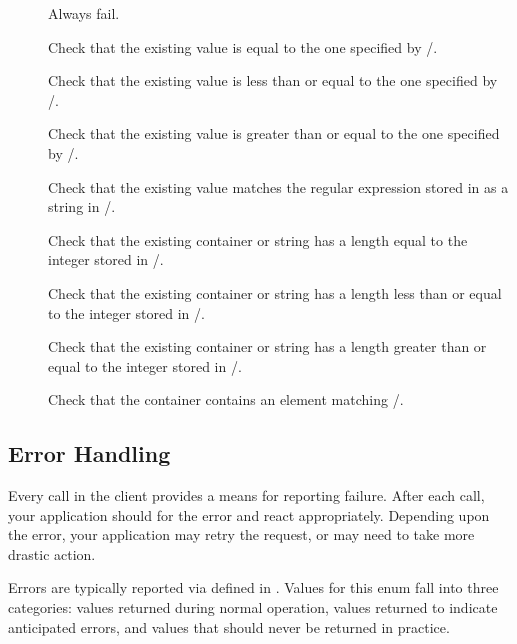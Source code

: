 \begin{description}
\item[] Always fail.
\item[] Check that the existing value is equal to
    the one specified by /.
\item[] Check that the existing value is less
    than or equal to the one specified by /.
\item[] Check that the existing value is
    greater than or equal to the one specified by /.
\item[] Check that the existing value matches the
    regular expression stored in as a string in /.
\item[] Check that the existing container
    or string has a length equal to the integer stored in
    /.
\item[] Check that the existing
    container or string has a length less than or equal to the integer stored in
    /.
\item[] Check that the existing
    container or string has a length greater than or equal to the integer stored
    in /.
\item[] Check that the container contains an
    element matching /.
\end{description}

\subsection{Error Handling}

Every call in the client provides a means for reporting failure.  After each
call, your application should for the error and react appropriately.  Depending
upon the error, your application may retry the request, or may need to take more
drastic action.

Errors are typically reported via 
defined in .  Values for this enum fall into three
categories:  values returned during normal operation, values returned to
indicate anticipated errors, and values that should never be returned in
practice.


